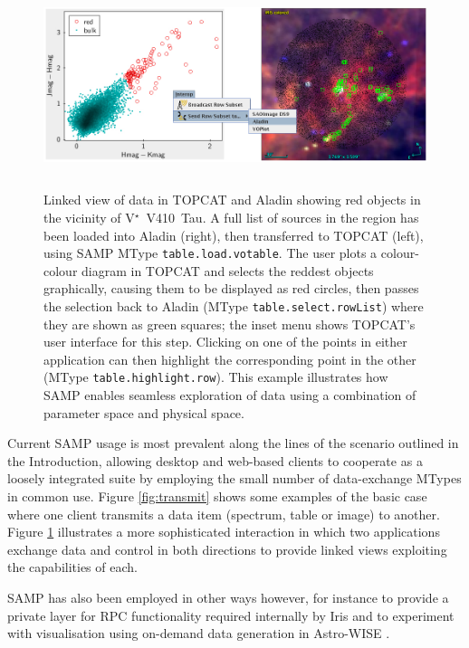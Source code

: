 \documentclass[5p]{elsarticle}
\begin{document}
\begin{figure}
\begin{center}
\includegraphics[height=6cm]{linked-ir.png}
\end{center}
\caption{\label{fig:linked}
Linked view of data in TOPCAT and Aladin showing
red objects in the vicinity of V$^{\star}$~V410~Tau.
A full list of sources in the region has been loaded
into Aladin (right), then transferred to TOPCAT (left),
using SAMP MType {\tt table.load.votable}.
The user plots a colour-colour diagram in TOPCAT
and selects the reddest objects graphically,
causing them to be displayed as red circles,
then passes the selection back to Aladin
(MType {\tt table.select.rowList}) where
they are shown as green squares;
the inset menu shows TOPCAT's user interface for this step.
Clicking on one of the points in either application can
then highlight the corresponding point in the other
(MType {\tt table.highlight.row}).
This example illustrates how SAMP enables seamless exploration of
data using a combination of parameter space and physical space.
}
\end{figure}

Current SAMP usage is most prevalent along the lines of the scenario
outlined in the Introduction, allowing desktop and web-based clients to
cooperate as a loosely integrated suite
by employing the small number of data-exchange MTypes in common use.
Figure \ref{fig:transmit} shows some examples of
the basic case where one client transmits a data item
(spectrum, table or image) to another.
Figure \ref{fig:linked} illustrates a more sophisticated
interaction in which two applications exchange data and control
in both directions to provide linked views exploiting the
capabilities of each.

SAMP has also been employed in other ways however,
for instance to provide a private layer for RPC functionality
required internally by Iris \citep{ACVOiris}
and to experiment with visualisation using on-demand
data generation in Astro-WISE \citep{2013ExA....35..283B}.
\end{document}
